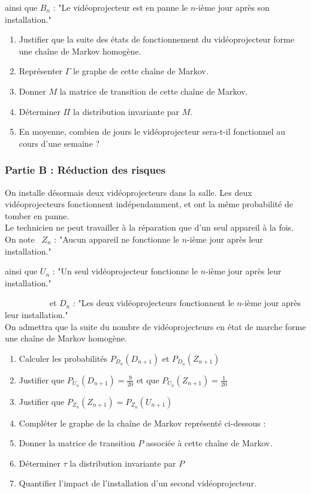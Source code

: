 \documentclass[oneside,12pt]{book}          %
\begin{document}
ainsi que  $B_n$ : "Le vidéoprojecteur est en panne le $n$-ième jour après son installation."

\begin{enumerate}
    \item Justifier que la suite des états de fonctionnement du vidéoprojecteur forme une chaîne de Markov homogène.
    \item Représenter $\Gamma$ le graphe de cette chaîne de Markov.
    \item Donner $M$ la matrice de transition de cette chaîne de Markov.
    \item Déterminer $\Pi$ la distribution invariante par $M$.
    \item En moyenne, combien de jours le vidéoprojecteur sera-t-il fonctionnel au cours d'une semaine ?
\end{enumerate}

\subsubsection*{Partie B : Réduction des risques}

On installe désormais deux vidéoprojecteurs dans la salle. Les deux vidéoprojecteurs fonctionnent indépendamment, et ont la même probabilité de tomber en panne.\\[5pt]
Le technicien ne peut travailler à la réparation que d'un seul appareil à la fois.\\[5pt]
On note ~$Z_n$ : "Aucun appareil ne fonctionne le $n$-ième jour après leur installation."

ainsi que  $U_n$ : "Un seul vidéoprojecteur fonctionne le $n$-ième jour après leur installation."

~~~~~~~~~~ et $D_n$ : "Les deux vidéoprojecteurs fonctionnent le $n$-ième jour après leur installation."\\[5pt]
On admettra que la suite du nombre de vidéoprojecteurs en état de marche forme une chaîne de Markov homogène.

\begin{enumerate}
    \item Calculer les probabilités $P_{D_n}(D_{n+1})$ et $P_{D_n}(Z_{n+1})$
    \item Justifier que $P_{U_n}(D_{n+1})=\frac{9}{20}$ et que $P_{U_n}(Z_{n+1})=\frac{1}{20}$
    \item Justifier que $P_{Z_n}(Z_{n+1})=P_{Z_n}(U_{n+1})$
    \item Compléter le graphe de la chaîne de Markov représenté ci-dessous :
    \item Donner la matrice de transition $P$ associée à cette chaîne de Markov.
    \item Déterminer $\tau$ la distribution invariante par $P$
    \item Quantifier l'impact de l'installation d'un second vidéoprojecteur.
\end{enumerate}
\end{document}
